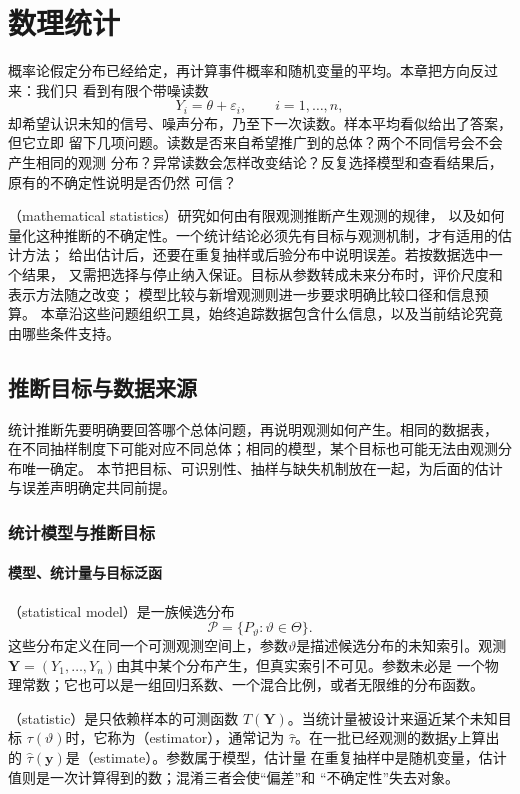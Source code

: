 \chapter{数理统计}
\label{chap:mathematical-statistics}

概率论假定分布已经给定，再计算事件概率和随机变量的平均。本章把方向反过来：我们只
看到有限个带噪读数
\[
  Y_i=\theta+\varepsilon_i,\qquad i=1,\ldots,n,
\]
却希望认识未知的信号、噪声分布，乃至下一次读数。样本平均看似给出了答案，但它立即
留下几项问题。读数是否来自希望推广到的总体？两个不同信号会不会产生相同的观测
分布？异常读数会怎样改变结论？反复选择模型和查看结果后，原有的不确定性说明是否仍然
可信？

（mathematical statistics）研究如何由有限观测推断产生观测的规律，
以及如何量化这种推断的不确定性。一个统计结论必须先有目标与观测机制，才有适用的估计方法；
给出估计后，还要在重复抽样或后验分布中说明误差。若按数据选中一个结果，
又需把选择与停止纳入保证。目标从参数转成未来分布时，评价尺度和表示方法随之改变；
模型比较与新增观测则进一步要求明确比较口径和信息预算。
本章沿这些问题组织工具，始终追踪数据包含什么信息，以及当前结论究竟由哪些条件支持。

\section{推断目标与数据来源}
\label{sec:stats-targets-data-sources}

统计推断先要明确要回答哪个总体问题，再说明观测如何产生。相同的数据表，
在不同抽样制度下可能对应不同总体；相同的模型，某个目标也可能无法由观测分布唯一确定。
本节把目标、可识别性、抽样与缺失机制放在一起，为后面的估计与误差声明确定共同前提。

\subsection{统计模型与推断目标}
\label{sec:statistics-model-target}

\subsubsection{模型、统计量与目标泛函}

\begin{definition}[统计模型与统计量]
  \label{def:statistics-model-statistic}
（statistical model）是一族候选分布
\[
  \mathcal{P}=\{P_\vartheta:\vartheta\in\Theta\}.
\]
这些分布定义在同一个可测观测空间上，参数\(\vartheta\)是描述候选分布的未知索引。观测
\(\bm{Y}=(Y_1,\ldots,Y_n)\)由其中某个分布产生，但真实索引不可见。参数未必是
一个物理常数；它也可以是一组回归系数、一个混合比例，或者无限维的分布函数。

（statistic）是只依赖样本的可测函数
\(T(\bm{Y})\)。当统计量被设计来逼近某个未知目标
\(\tau(\vartheta)\)时，它称为（estimator），通常记为
\(\widehat{\tau}\)。在一批已经观测的数据\(\bm{y}\)上算出的
\(\widehat{\tau}(\bm{y})\)是（estimate）。参数属于模型，估计量
在重复抽样中是随机变量，估计值则是一次计算得到的数；混淆三者会使“偏差”和
“不确定性”失去对象。
\end{definition}

